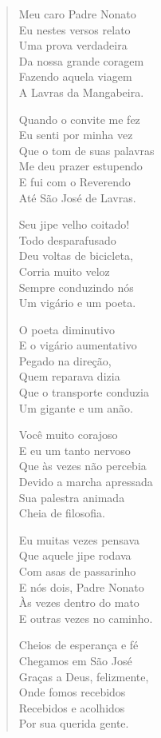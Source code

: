 \begin{verse}
Meu caro Padre Nonato\\
Eu nestes versos relato\\
Uma prova verdadeira\\
Da nossa grande coragem\\
Fazendo aquela viagem\\
A Lavras da Mangabeira.

Quando o convite me fez\\
Eu senti por minha vez\\
Que o tom de suas palavras\\
Me deu prazer estupendo\\
E fui com o Reverendo\\
Até São José de Lavras.

Seu jipe velho coitado!\\
Todo desparafusado\\
Deu voltas de bicicleta,\\
Corria muito veloz\\
Sempre conduzindo nós\\
Um vigário e um poeta.

O poeta diminutivo\\
E o vigário aumentativo\\
Pegado na direção,\\
Quem reparava dizia\\
Que o transporte conduzia\\
Um gigante e um anão.

Você muito corajoso\\
E eu um tanto nervoso\\
Que às vezes não percebia\\
Devido a marcha apressada\\
Sua palestra animada\\
Cheia de filosofia.

Eu muitas vezes pensava\\
Que aquele jipe rodava\\
Com asas de passarinho\\
E nós dois, Padre Nonato\\
Às vezes dentro do mato\\
E outras vezes no caminho.

Cheios de esperança e fé\\
Chegamos em São José\\
Graças a Deus, felizmente,\\
Onde fomos recebidos\\
Recebidos e acolhidos\\
Por sua querida gente.


\end{verse}
